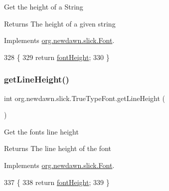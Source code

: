 Get the height of a String

\begin{DoxyReturn}{Returns}
The height of a given string 
\end{DoxyReturn}


Implements \mbox{\hyperlink{interfaceorg_1_1newdawn_1_1slick_1_1_font_ac6a8b604bee484ad3ac2dd57a3eb65c9}{org.\+newdawn.\+slick.\+Font}}.


\begin{DoxyCode}
328                                               \{
329         \textcolor{keywordflow}{return} \mbox{\hyperlink{classorg_1_1newdawn_1_1slick_1_1_true_type_font_a9bf36f9ee8aac6e87f0d1e2ba299cb3e}{fontHeight}};
330     \}
\end{DoxyCode}
\mbox{\label{classorg_1_1newdawn_1_1slick_1_1_true_type_font_a16d8fe4babd9423e3cc197662889faaf}} 
\subsubsection{\texorpdfstring{get\+Line\+Height()}{getLineHeight()}}
{\footnotesize\ttfamily int org.\+newdawn.\+slick.\+True\+Type\+Font.\+get\+Line\+Height (\begin{DoxyParamCaption}{ }\end{DoxyParamCaption})\hspace{0.3cm}{\ttfamily [inline]}}

Get the font\textquotesingle{}s line height

\begin{DoxyReturn}{Returns}
The line height of the font 
\end{DoxyReturn}


Implements \mbox{\hyperlink{interfaceorg_1_1newdawn_1_1slick_1_1_font_aeb4b7770f47c5e2631d84b35924376d7}{org.\+newdawn.\+slick.\+Font}}.


\begin{DoxyCode}
337                                \{
338         \textcolor{keywordflow}{return} \mbox{\hyperlink{classorg_1_1newdawn_1_1slick_1_1_true_type_font_a9bf36f9ee8aac6e87f0d1e2ba299cb3e}{fontHeight}};
339     \}
\end{DoxyCode}
\mbox{\label{classorg_1_1newdawn_1_1slick_1_1_true_type_font_ad5614f14f3194de0b68f9fe095ab0bfa}} 
